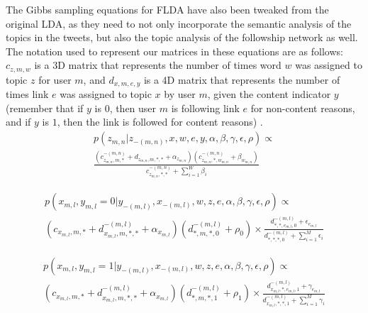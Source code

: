 \documentclass[a4paper]{article}
\begin{document}
The Gibbs sampling equations for FLDA have also been tweaked from the original LDA, as they need to not only incorporate the semantic analysis of the topics in the tweets, but also the topic analysis of the followship network as well. The notation used to represent our matrices in these equations are as follows: $c_{z, m, w}$ is a 3D matrix that represents the number of times word $w$ was assigned to topic $z$ for user $m$, and $d_{x, m, e, y}$ is a 4D matrix that represents the number of times link $e$ was assigned to topic $x$ by user $m$, given the content indicator $y$ (remember that if $y$ is $0$, then user $m$ is following link $e$ for non-content reasons, and if $y$ is $1$, then the link is followed for content reasons) \cite{flda}.
\begin{equation}\label{eq:flda_sem}
  \begin{gathered}
    p(z_{m, n} | z_{-(m, n)}, x, w, e, y, \alpha, \beta, \gamma, \epsilon, \rho) \propto \\
      \frac{(c_{z_{m, n}, m, *}^{-(m, n)} + d_{z_{m, n}, m, *, *} + \alpha_{z_{m, n}})
      (c_{z_{m, n}, *, w_{m, n}}^{-(m, n)} + \beta_{w_{m, n}})}
      {c_{z_{m, n}, *, *}^{-(m, n)} + \sum^W_{i = 1}\beta_i}
  \end{gathered}
\end{equation}

\begin{equation}\label{eq:flda_net_0}
  \begin{gathered}
    p(x_{m, l}, y_{m, l} = 0 | y_{-(m, l)}, x_{-(m, l)}, w, z, e, \alpha, \beta, \gamma, \epsilon, \rho) \propto \\
      (c_{x_{m, l}, m, *} + d_{x_{m, l}, m, *, *}^{-(m, l)} + \alpha_{x_{m, l}})(d_{*, m, *, 0}^{-(m, l)} + \rho_0) \times
      \frac{d_{*, *, e_{m, l}, 0}^{-(m, l)} + \epsilon_{e_{m, l}}}
      {d_{*, *, *, 0}^{-(m, l)} + \sum^M_{i = 1}\epsilon_i}
  \end{gathered}
\end{equation}

\begin{equation}\label{eq:flda_net_1}
  \begin{gathered}
    p(x_{m, l}, y_{m, l} = 1 | y_{-(m, l)}, x_{-(m, l)}, w, z, e, \alpha, \beta, \gamma, \epsilon, \rho) \propto \\
      (c_{x_{m, l}, m, *} + d_{x_{m, l}, m, *, *}^{-(m, l)} + \alpha_{x_{m, l}})(d_{*, m, *, 1}^{-(m, l)} + \rho_1) \times
      \frac{d_{x_{m, l}, *, e_{m, l}, 1}^{-(m, l)} + \gamma_{e_{m, l}}}
      {d_{x_{m, l}, *, *, 1}^{-(m, l)} + \sum^M_{i = 1}\gamma_i}
  \end{gathered}
\end{equation}
\end{document}
